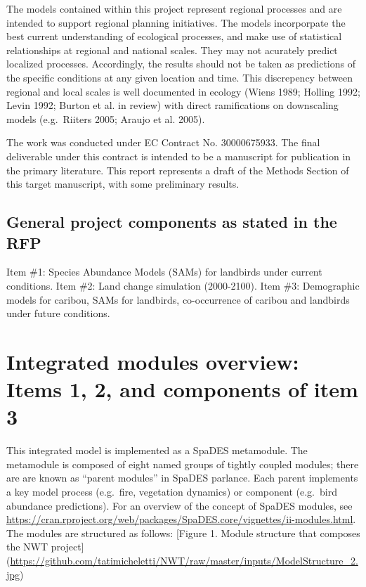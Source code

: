 \documentclass[]{article}
\begin{document}
The models contained within this project represent regional processes
and are intended to support regional planning initiatives. The models
incorporpate the best current understanding of ecological processes, and
make use of statistical relationships at regional and national scales.
They may not acurately predict localized processes. Accordingly, the
results should not be taken as predictions of the specific conditions at
any given location and time. This discrepency between regional and local
scales is well documented in ecology (Wiens 1989; Holling 1992; Levin
1992; Burton et al. in review) with direct ramifications on downscaling
models (e.g.~Riiters 2005; Araujo et al. 2005).

The work was conducted under EC Contract No. 30000675933. The final
deliverable under this contract is intended to be a manuscript for
publication in the primary literature. This report represents a draft of
the Methods Section of this target manuscript, with some preliminary
results.

\subsection{General project components as stated in the
RFP}\label{general-project-components-as-stated-in-the-rfp}

Item \#1: Species Abundance Models (SAMs) for landbirds under current
conditions. Item \#2: Land change simulation (2000-2100). Item \#3:
Demographic models for caribou, SAMs for landbirds, co-occurrence of
caribou and landbirds under future conditions.

\section{Integrated modules overview: Items 1, 2, and components of item
3}\label{integrated-modules-overview-items-1-2-and-components-of-item-3}

This integrated model is implemented as a SpaDES metamodule. The
metamodule is composed of eight named groups of tightly coupled modules;
there are are known as ``parent modules'' in SpaDES parlance. Each
parent implements a key model process (e.g.~fire, vegetation dynamics)
or component (e.g.~bird abundance predictions). For an overview of the
concept of SpaDES modules, see
\url{https://cran.rproject.org/web/packages/SpaDES.core/vignettes/ii-modules.html}.
The modules are structured as follows: {[}Figure 1. Module structure
that composes the NWT project{]}
(\url{https://github.com/tatimicheletti/NWT/raw/master/inputs/ModelStructure_2.jpg})
\end{document}
